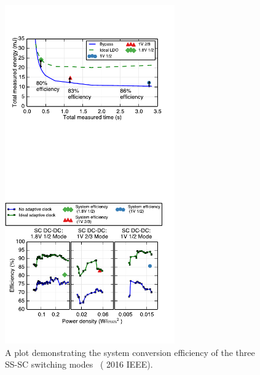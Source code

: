 \documentclass[graybox]{svmult}
\begin{document}
\begin{figure}
  \centering
  \includegraphics[width=0.65\textwidth]{6-raven3-dcdc-efficiency}
  \caption{A plot demonstrating the system conversion efficiency of the three SS-SC switching modes~\cite{Zimmer2016} ({\textcopyright} 2016 IEEE).}
  \label{fig:6-raven3-dcdc-efficiency}
\end{figure}
\end{document}
